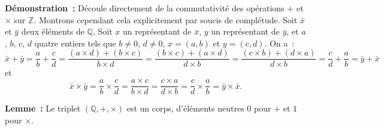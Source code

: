 \noindent\textbf{Démonstration :} Découle directement de la commutativité des opérations $+$ et $\times$ sur $\mathbb{Z}$. 
    Montrons cependant cela explicitement par soucis de complétude. 
    Soit $\bar{x}$ et $\bar{y}$ deux éléments de $\mathbb{Q}$. 
    Soit $x$ un représentant de $\bar{x}$, $y$ un représentant de $\bar{y}$, et $a$, $b$, $c$, $d$ quatre entiers tels que $b \neq 0$, $d \neq 0$, $x = (a, b)$ et $y = (c, d)$.
    On a : 
    \begin{equation*}
        \bar{x} + \bar{y} 
            = \frac{a}{b} + \frac{c}{d} 
            = \frac{(a \times d) + (b \times c)}{b \times d}
            = \frac{(b \times c) + (a \times d)}{d \times b}
            = \frac{(c \times b) + (d \times a)}{d \times b}
            = \frac{c}{d} + \frac{a}{b}
            = \bar{y} + \bar{x}
    \end{equation*}
    et 
    \begin{equation*}
        \bar{x} \times \bar{y} 
            = \frac{a}{b} \times \frac{c}{d} 
            = \frac{a \times c}{b \times d}
            = \frac{c \times a}{d \times b}
            = \frac{c}{d} \times \frac{a}{b}
            = \bar{y} \times \bar{x} .
    \end{equation*}

\done

\medskip

\noindent\textbf{Lemme :} Le triplet $(\mathbb{Q}, +, \times)$ est un corps, d'éléments neutres $0$ pour $+$ et $1$ pour $\times$.

\medskip


